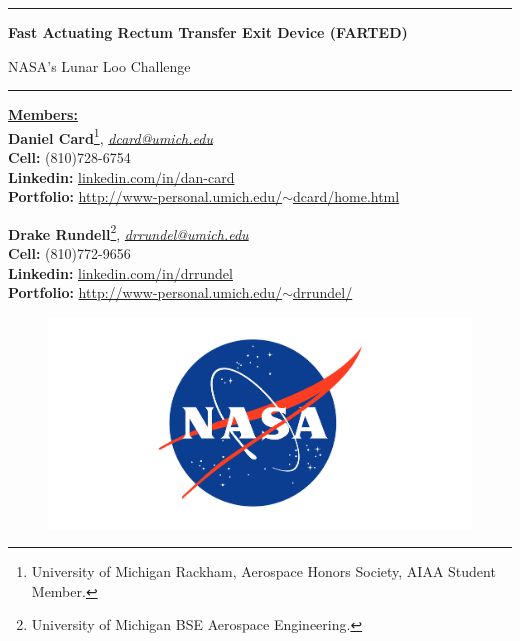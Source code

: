 \thispagestyle{empty}
    
\rule{\textwidth}{3pt}

\vspace{1cm}
\textbf{\LARGE{Fast Actuating Rectum Transfer Exit} Device (FARTED)}

\bigskip

NASA's Lunar Loo Challenge

\rule{\textwidth}{1pt}

\vspace{1cm}
\begin{flushleft}
    \underline{\textbf{\LARGE{Members:}}}\\
    \textbf{Daniel Card}\footnote{University of Michigan Rackham, Aerospace Honors Society, AIAA Student Member.}, \href{mailto:dcard@umich.edu}{\textit{dcard@umich.edu}}\\
    \textbf{Cell:} (810)728-6754\\
    \textbf{Linkedin:} \href{http://www.linkedin.com/in/dan-card}{linkedin.com/in/dan-card}\\
    \textbf{Portfolio:}  \href{http://www-personal.umich.edu/~dcard/home.html}{http://www-personal.umich.edu/$\sim$dcard/home.html}

    \bigskip
    \textbf{Drake Rundell}\footnote{University of Michigan BSE Aerospace Engineering.}, \href{mailto:drrundel}{\textit{drrundel@umich.edu}}\\
    \textbf{Cell:} (810)772-9656\\
    \textbf{Linkedin:} \href{http://www.linkedin.com/in/drrundel}{linkedin.com/in/drrundel}\\
    \textbf{Portfolio:}  \href{http://www-personal.umich.edu/~drrundel/}{http://www-personal.umich.edu/$\sim$drrundel/}
\end{flushleft}

\begin{figure}[h]
    \centering
    \includegraphics[width = \linewidth]{administrative/nasa-logo-web-rgb.png}
\end{figure}

\vfill
